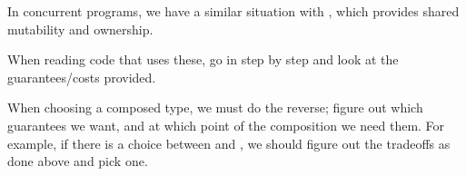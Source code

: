 \blank

In concurrent programs, we have a similar situation with , which provides shared mutability and ownership.

\blank

When reading code that uses these, go in step by step and look at the guarantees/costs provided.

\blank

When choosing a composed type, we must do the reverse; figure out which guarantees we want, and at which point of the 
composition we need them. For example, if there is a choice between  and , we 
should figure out the tradeoffs as done above and pick one.

